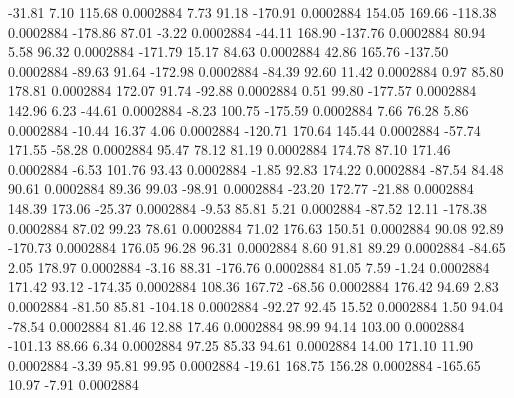       -31.81        7.10      115.68     0.0002884
        7.73       91.18     -170.91     0.0002884
      154.05      169.66     -118.38     0.0002884
     -178.86       87.01       -3.22     0.0002884
      -44.11      168.90     -137.76     0.0002884
       80.94        5.58       96.32     0.0002884
     -171.79       15.17       84.63     0.0002884
       42.86      165.76     -137.50     0.0002884
      -89.63       91.64     -172.98     0.0002884
      -84.39       92.60       11.42     0.0002884
        0.97       85.80      178.81     0.0002884
      172.07       91.74      -92.88     0.0002884
        0.51       99.80     -177.57     0.0002884
      142.96        6.23      -44.61     0.0002884
       -8.23      100.75     -175.59     0.0002884
        7.66       76.28        5.86     0.0002884
      -10.44       16.37        4.06     0.0002884
     -120.71      170.64      145.44     0.0002884
      -57.74      171.55      -58.28     0.0002884
       95.47       78.12       81.19     0.0002884
      174.78       87.10      171.46     0.0002884
       -6.53      101.76       93.43     0.0002884
       -1.85       92.83      174.22     0.0002884
      -87.54       84.48       90.61     0.0002884
       89.36       99.03      -98.91     0.0002884
      -23.20      172.77      -21.88     0.0002884
      148.39      173.06      -25.37     0.0002884
       -9.53       85.81        5.21     0.0002884
      -87.52       12.11     -178.38     0.0002884
       87.02       99.23       78.61     0.0002884
       71.02      176.63      150.51     0.0002884
       90.08       92.89     -170.73     0.0002884
      176.05       96.28       96.31     0.0002884
        8.60       91.81       89.29     0.0002884
      -84.65        2.05      178.97     0.0002884
       -3.16       88.31     -176.76     0.0002884
       81.05        7.59       -1.24     0.0002884
      171.42       93.12     -174.35     0.0002884
      108.36      167.72      -68.56     0.0002884
      176.42       94.69        2.83     0.0002884
      -81.50       85.81     -104.18     0.0002884
      -92.27       92.45       15.52     0.0002884
        1.50       94.04      -78.54     0.0002884
       81.46       12.88       17.46     0.0002884
       98.99       94.14      103.00     0.0002884
     -101.13       88.66        6.34     0.0002884
       97.25       85.33       94.61     0.0002884
       14.00      171.10       11.90     0.0002884
       -3.39       95.81       99.95     0.0002884
      -19.61      168.75      156.28     0.0002884
     -165.65       10.97       -7.91     0.0002884
